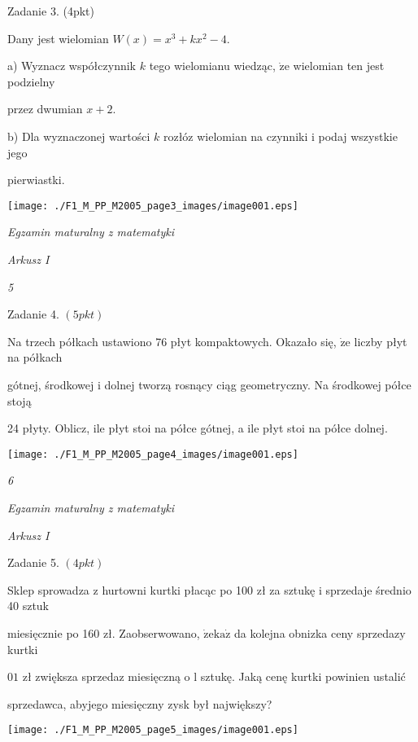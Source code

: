 \documentclass[a4paper,12pt]{article}
\begin{document}
Zadanie 3. (4pkt)

Dany jest wielomian $W(x)=x^{3}+kx^{2}-4.$

a) Wyznacz współczynnik $k$ tego wielomianu wiedząc, $\dot{\mathrm{z}}\mathrm{e}$ wielomian ten jest podzielny

przez dwumian $x+2.$

b) Dla wyznaczonej wartości $k$ rozłóz wielomian na czynniki i podaj wszystkie jego

pierwiastki.
\begin{center}
\texttt{[image: ./F1\_M\_PP\_M2005\_page3\_images/image001.eps]}
\end{center}




{\it Egzamin maturalny z matematyki}

{\it Arkusz I}

{\it 5}

Zadanie 4. $(5pkt)$

Na trzech półkach ustawiono 76 płyt kompaktowych. Okazało się, $\dot{\mathrm{z}}\mathrm{e}$ liczby płyt na półkach

gótnej, środkowej i dolnej tworzą rosnący ciąg geometryczny. Na środkowej półce stoją

24 płyty. Oblicz, ile płyt stoi na półce gótnej, a ile płyt stoi na półce dolnej.
\begin{center}
\texttt{[image: ./F1\_M\_PP\_M2005\_page4\_images/image001.eps]}
\end{center}




{\it 6}

{\it Egzamin maturalny z matematyki}

{\it Arkusz I}

Zadanie 5. $(4pkt)$

Sklep sprowadza z hurtowni kurtki płacąc po 100 zł za sztukę i sprzedaje średnio 40 sztuk

miesięcznie po 160 zł. Zaobserwowano, $\dot{\mathrm{z}}\mathrm{e} \mathrm{k}\mathrm{a}\dot{\mathrm{z}}$ da kolejna obnizka ceny sprzedaz$\mathrm{y}$ kurtki

$01$ zł zwiększa sprzedaz miesięczną o l sztukę. Jaką cenę kurtki powinien ustalić

sprzedawca, abyjego miesięczny zysk był największy?
\begin{center}
\texttt{[image: ./F1\_M\_PP\_M2005\_page5\_images/image001.eps]}
\end{center}
\end{document}
